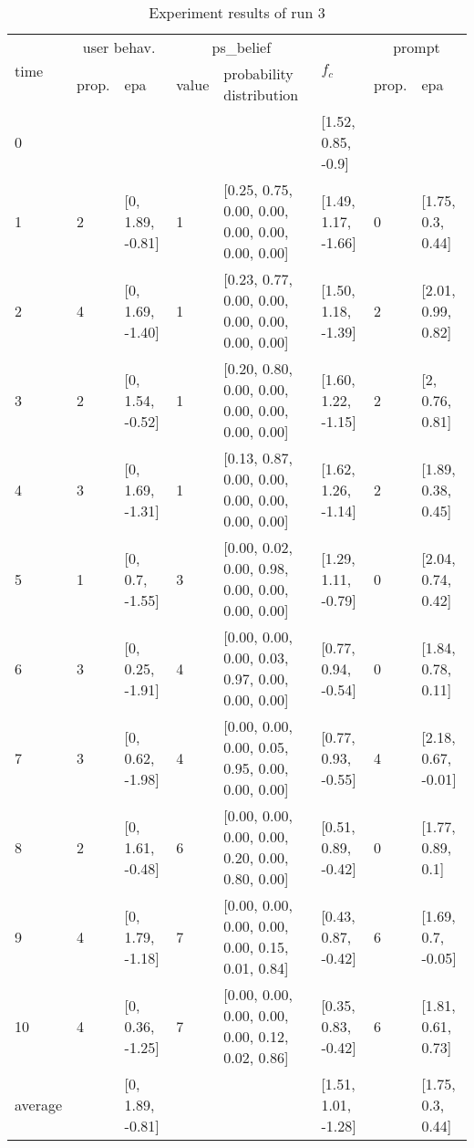 \begin{table}[htbp]\footnotesize
\caption{Experiment results of run 3}
\begin{tabular}{|p{0.4cm}|p{0.6cm}|l|p{0.6cm}|p{3.3cm}|l|p{0.6cm}|l|}
\hline

\multirow{2}{*}{time} & \multicolumn{2}{c|}{user behav.} & \multicolumn{2}{c|}{ps\_belief} &
\multirow{2}{*}{$f_c$} & \multicolumn{2}{c|}{prompt} \\ \cline{2-5}\cline{ 7- 8}
& prop. & epa & value & probability distribution &  & prop. & epa \\ \hline

0 & \multicolumn{1}{l|}{} &  & \multicolumn{1}{l|}{} &  & [1.52, 0.85, -0.9] & \multicolumn{1}{l|}{} &  \\ \hline
1 & 2 & [0, 1.89, -0.81] & 1 & [0.25, 0.75, 0.00, 0.00, 0.00, 0.00, 0.00, 0.00] & [1.49, 1.17, -1.66] & 0 & [1.75, 0.3, 0.44] \\ \hline
2 & 4 & [0, 1.69, -1.40] & 1 & [0.23, 0.77, 0.00, 0.00, 0.00, 0.00, 0.00, 0.00] & [1.50, 1.18, -1.39] & 2 & [2.01, 0.99, 0.82] \\ \hline
3 & 2 & [0, 1.54, -0.52] & 1 & [0.20, 0.80, 0.00, 0.00, 0.00, 0.00, 0.00, 0.00] & [1.60, 1.22, -1.15] & 2 & [2, 0.76, 0.81] \\ \hline
4 & 3 & [0, 1.69, -1.31] & 1 & [0.13, 0.87, 0.00, 0.00, 0.00, 0.00, 0.00, 0.00] & [1.62, 1.26, -1.14] & 2 & [1.89, 0.38, 0.45] \\ \hline
5 & 1 & [0, 0.7, -1.55] & 3 & [0.00, 0.02, 0.00, 0.98, 0.00, 0.00, 0.00, 0.00] & [1.29, 1.11, -0.79] & 0 & [2.04, 0.74, 0.42] \\ \hline
6 & 3 & [0, 0.25, -1.91] & 4 & [0.00, 0.00, 0.00, 0.03, 0.97, 0.00, 0.00, 0.00] & [0.77, 0.94, -0.54] & 0 & [1.84, 0.78, 0.11] \\ \hline
7 & 3 & [0, 0.62, -1.98] & 4 & [0.00, 0.00, 0.00, 0.05, 0.95, 0.00, 0.00, 0.00] & [0.77, 0.93, -0.55] & 4 & [2.18, 0.67, -0.01] \\ \hline
8 & 2 & [0, 1.61, -0.48] & 6 & [0.00, 0.00, 0.00, 0.00, 0.20, 0.00, 0.80, 0.00] & [0.51, 0.89, -0.42] & 0 & [1.77, 0.89, 0.1] \\ \hline
9 & 4 & [0, 1.79, -1.18] & 7 & [0.00, 0.00, 0.00, 0.00, 0.00, 0.15, 0.01, 0.84] & [0.43, 0.87, -0.42] & 6 & [1.69, 0.7, -0.05] \\ \hline
10 & 4 & [0, 0.36, -1.25] & 7 & [0.00, 0.00, 0.00, 0.00, 0.00, 0.12, 0.02, 0.86] & [0.35, 0.83, -0.42] & 6 & [1.81, 0.61, 0.73] \\ \hline
\multicolumn{1}{|l|}{average} & \multicolumn{1}{l|}{} & [0, 1.89, -0.81] & \multicolumn{1}{l|}{} &  & [1.51, 1.01, -1.28] & \multicolumn{1}{l|}{} & [1.75, 0.3, 0.44] \\ \hline
\end{tabular}
\label{}
\end{table}



